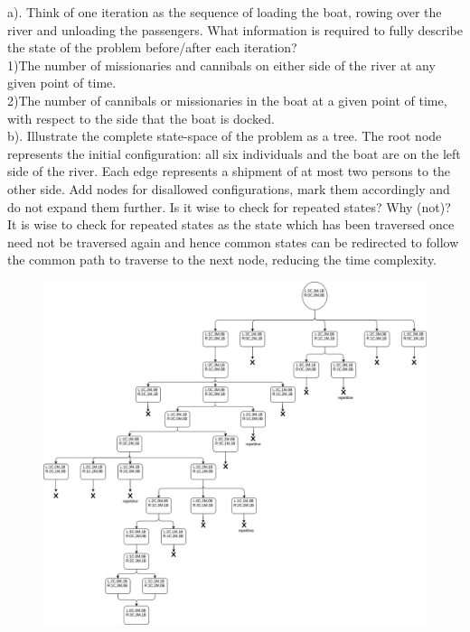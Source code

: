 \documentclass{scrartcl}
\begin{document}
a). Think of one iteration as the sequence of loading the boat, rowing over the river and unloading the passengers. What information is required to fully describe the state of the problem before/after each iteration? \\

1)The number of missionaries and cannibals on either side of the river at any given point of time.\\

2)The number of cannibals or missionaries in the boat at a given point of time, with respect to the side that the boat is docked.\\


b). Illustrate the complete state-space of the problem as a tree. The root node represents the initial configuration: all six individuals and the boat are on the left side of the river. Each edge represents a shipment of at most two persons to the other side. Add nodes for disallowed configurations, mark them accordingly and do not expand
them further. Is it wise to check for repeated states? Why (not)? \\

It is wise to check for repeated states as the state which has been traversed once need not be traversed again and hence common states can be redirected to follow the common path to traverse to the next node, reducing the time complexity. \\

\begin{figure}
\includegraphics[width=\linewidth]{tree}
\end{figure}
\end{document}
